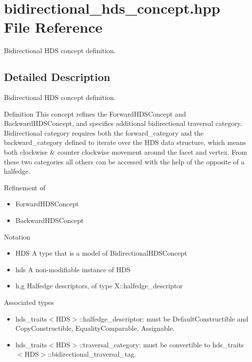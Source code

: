 \section{bidirectional\_\-hds\_\-concept.hpp File Reference}
\label{bidirectional__hds__concept_8hpp}
Bidirectional HDS concept definition. 



\subsection{Detailed Description}
Bidirectional HDS concept definition. 

\begin{Desc}
\item[Definition]This concept refines the Forward\-HDSConcept and Backward\-HDSConcept, and specifies additional bidirectional traversal category. Bidirectional category requires both the forward\_\-category and the backward\_\-category defined to iterate over the HDS data structure, which means both clockwise \& counter clockwise movement around the facet and vertex. From these two categories all others can be accessed with the help of the opposite of a halfedge.\end{Desc}
\begin{Desc}
\item[Refinement of]\begin{itemize}
\item Forward\-HDSConcept\item Backward\-HDSConcept\end{itemize}
\end{Desc}
\begin{Desc}
\item[Notation]\begin{itemize}
\item HDS A type that is a model of Bidirectional\-HDSConcept\item hds A non-modifiable instance of HDS\item h,g Halfedge descriptors, of type X::halfedge\_\-descriptor\end{itemize}
\end{Desc}
\begin{Desc}
\item[Associated types]\begin{itemize}
\item hds\_\-traits$<$HDS$>$::halfedge\_\-descriptor: must be Default\-Constructible and Copy\-Constructible, Equality\-Comparable, Assignable.\item hds\_\-traits$<$HDS$>$::traversal\_\-category: must be convertible to hds\_\-traits$<$HDS$>$::bidirectional\_\-traversal\_\-tag.\end{itemize}
\end{Desc}
